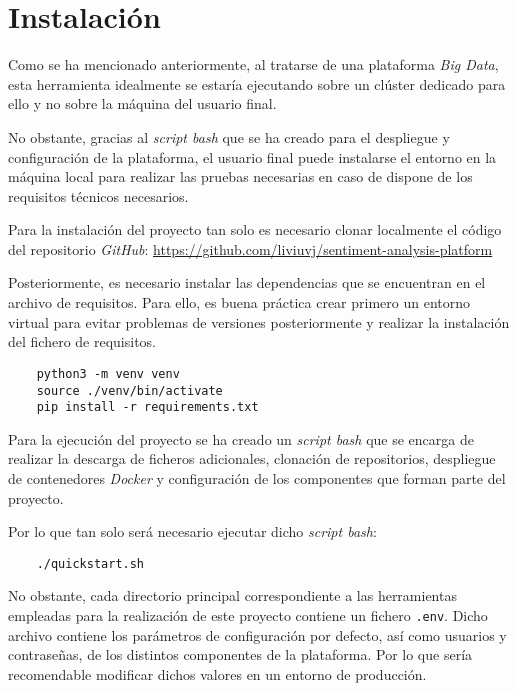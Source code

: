 \section{Instalación}

Como se ha mencionado anteriormente, al tratarse de una plataforma \textit{Big Data}, esta herramienta idealmente se estaría ejecutando sobre un clúster dedicado para ello y no sobre la máquina del usuario final.

No obstante, gracias al \textit{script bash} que se ha creado para el despliegue y configuración de la plataforma, el usuario final puede instalarse el entorno en la máquina local para realizar las pruebas necesarias en caso de dispone de los requisitos técnicos necesarios. 

Para la instalación del proyecto tan solo es necesario clonar localmente el código del repositorio \textit{GitHub}: \url{https://github.com/liviuvj/sentiment-analysis-platform}

Posteriormente, es necesario instalar las dependencias que se encuentran en el archivo de requisitos. Para ello, es buena práctica crear primero un entorno virtual para evitar problemas de versiones posteriormente y realizar la instalación del fichero de requisitos.

\begin{verbatim}
    python3 -m venv venv
    source ./venv/bin/activate
    pip install -r requirements.txt
\end{verbatim}

Para la ejecución del proyecto se ha creado un \textit{script bash} que se encarga de realizar la descarga de ficheros adicionales, clonación de repositorios, despliegue de contenedores \textit{Docker} y configuración de los componentes que forman parte del proyecto.

\vspace{2cm}

Por lo que tan solo será necesario ejecutar dicho \textit{script bash}:

\begin{verbatim}
    ./quickstart.sh
\end{verbatim}

No obstante, cada directorio principal correspondiente a las herramientas empleadas para la realización de este proyecto contiene un fichero \texttt{.env}. Dicho archivo contiene los parámetros de configuración por defecto, así como usuarios y contraseñas, de los distintos componentes de la plataforma. Por lo que sería recomendable modificar dichos valores en un entorno de producción.



